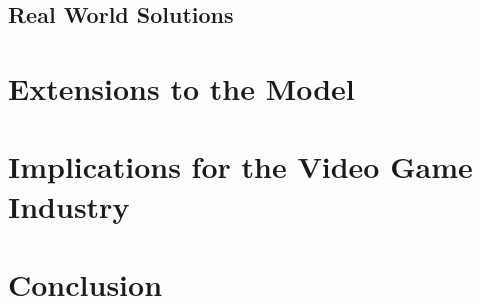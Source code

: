 \documentclass[a4paper,12pt]{article}
\numberwithin{equation}{section}
\begin{document}
\subsection{Real World Solutions}



\section{Extensions to the Model} \label{Sec:Extensions}

\section{Implications for the Video Game Industry}

\section{Conclusion}



\end{document}

